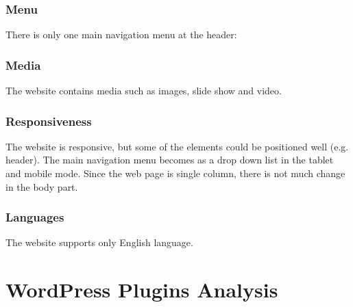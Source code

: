 \subsubsection*{Menu}
There is only one main navigation menu at the header:

\subsubsection*{Media}
The website contains media such as images, slide show and video.

\subsubsection*{Responsiveness}
The website is responsive, but some of the elements could be positioned well (e.g. header). The main navigation menu becomes as a drop down list in the tablet and mobile mode. Since the web page is single column, there is not much change in the body part.

\subsubsection*{Languages}
The website supports only English language.


\section{WordPress Plugins Analysis}